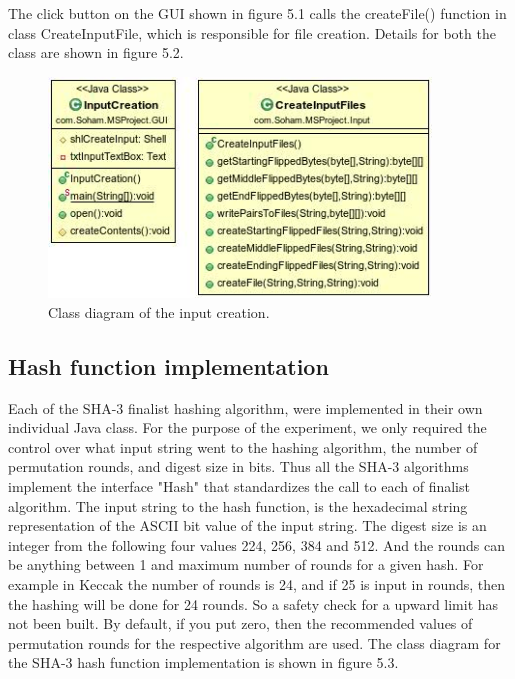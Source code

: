 The click button on the GUI shown in figure 5.1 calls the createFile() function in class CreateInputFile, which 
is responsible for file creation. Details for both the class are shown in figure 5.2.

\begin{figure}
  \begin{center}
    \includegraphics[width=4in]{Input.jpg}
  \end{center}
  \caption{Class diagram of the input creation.}
  \label{fig:UMLInputCreation}
\end{figure}

\subsection{Hash function implementation}

Each of the SHA-3 finalist hashing algorithm, were implemented in their own individual Java class. For the purpose
of the experiment, we only required the control over what input string went to the hashing algorithm, the number
of permutation rounds, and digest size in bits. Thus all the SHA-3 algorithms implement the interface "Hash" that
standardizes the call to each of finalist algorithm. The input string to the hash function, is the hexadecimal 
string representation of the ASCII bit value of the input string. The digest size is an integer from the following
four values 224, 256, 384 and 512. And the rounds can be anything between 1 and maximum number of rounds for a
given hash. For example in Keccak the number of rounds is 24, and if 25 is input in rounds, then the hashing will
be done for 24 rounds. So a safety check for a upward limit has not been built. By default, if you put zero, then
the recommended values of permutation rounds for the respective algorithm are used. The class diagram for the
SHA-3 hash function implementation is shown in figure 5.3.


